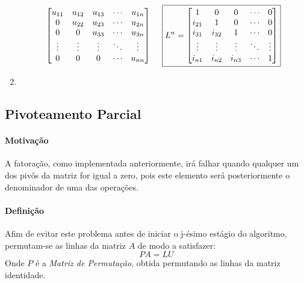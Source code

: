 \documentclass{article}
\begin{document}
\begin{enumerate}[noitemsep]
\[{                    \begin{bmatrix}
                        u_{11} & u_{12} & u_{13} & \cdots & u_{1n}\\
                        0      & u_{22} & u_{23} & \cdots & u_{2n}\\
                        0      & 0      & u_{33} & \cdots & u_{3n}\\
                        \vdots & \vdots & \vdots & \ddots & \vdots\\
                        0      & 0      & 0      & \cdots & u_{nn}
                    \end{bmatrix}}\hspace{5mm}
                \boxed{L^{n}=
                    \begin{bmatrix}
                        1      & 0      & 0      & \cdots & 0\\
                        i_{21} & 1      & 0      & \cdots & 0\\
                        i_{31} & i_{32} & 1      & \cdots & 0\\
                        \vdots & \vdots & \vdots & \ddots & \vdots\\
                        i_{n1} & i_{n2} & i_{n3} & \cdots & 1
                    \end{bmatrix}}
                \]
                \item 
            \end{enumerate}
        
        \subsection{Pivoteamento Parcial}
            \paragraph{Motivação}A fatoração, como implementada anteriormente, irá falhar quando qualquer um dos pivôs da matriz for igual a zero, pois este elemento será posteriormente o denominador de uma das operações.

            \paragraph{Definição}Afim de evitar este problema antes de iniciar o j-ésimo estágio do algoritmo, permutam-se as linhas da matriz $A$ de modo a satisfazer:
                \[PA = LU\]
            Onde $P$ é a \textit{Matriz de Permutação}, obtida permutando as linhas da matriz identidade.
\end{document}
